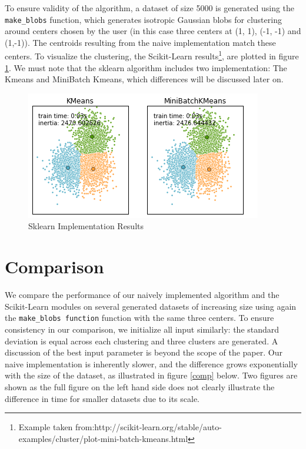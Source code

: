 \documentclass[11pt]{article}
\begin{document}
\noindent To ensure validity of the algorithm, a dataset of size 5000 is generated using the \verb|make_blobs| function, which generates isotropic Gaussian blobs for clustering around centers chosen by the user (in this case three centers at (1, 1), (-1, -1) and (1,-1)). The centroids resulting from the naive implementation match these centers.
To visualize the clustering, the Scikit-Learn results\footnote{Example taken from:http://scikit-learn.org/stable/auto-examples/cluster/plot-mini-batch-kmeans.html}, are plotted in figure \ref{results}. We must note that the sklearn algorithm includes two implementation: The Kmeans and MiniBatch Kmeans, which differences will be discussed later on.

	\begin{figure}[ht!] 
		\centering
		\includegraphics[scale=0.8]{Figures/kmeans.png}
		\caption{Sklearn Implementation Results}
		\label{results}
	\end{figure}

\section*{Comparison}

We compare the performance of our naively implemented algorithm and the Scikit-Learn modules on several generated datasets of increasing size using again the \verb|make_blobs function| function with the same three centers. To ensure consistency in our comparison, we initialize all input similarly: the standard deviation is equal across each clustering and three clusters are generated. A discussion of the best input parameter is  beyond the scope of the paper.  Our naive implementation is inherently slower, and the difference grows exponentially with the size of the dataset,  as illustrated in figure \ref{comp} below. Two figures are shown as the full figure on the left hand side does not clearly illustrate the difference in time for smaller datasets due to its scale.
\end{document}
